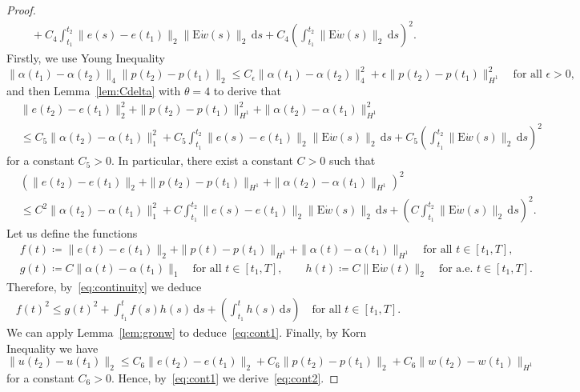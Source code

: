 \documentclass[10pt,a4paper]{amsart}
\def\EE {\mathrm{E}}
\def\de {\mathrm{d}}
\begin{document}
\begin{proof}
\begin{align*}
&\quad+C_4\int_{t_1}^{t_2}\|e(s)-e(t_1)\|_2\|\EE \dot w(s)\|_2\,\de s+C_4\left(\int_{t_1}^{t_2}\|\EE \dot w(s)\|_2\,\de s\right)^2.
\end{align*}
Firstly, we use Young Inequality
$$\|\alpha(t_1)-\alpha(t_2)\|_4\|p(t_2)-p(t_1)\|_2\le C_\epsilon\|\alpha(t_1)-\alpha(t_2)\|_4^2+\epsilon\|p(t_2)-p(t_1)\|_{H^1}^2\quad\text{for all $\epsilon>0$},$$
and then Lemma~\ref{lem:Cdelta} with $\theta=4$ to derive that
\begin{align*}
&\|e(t_2)-e(t_1)\|_2^2+\|p(t_2)-p(t_1)\|_{H^1}^2+\|\alpha(t_2)-\alpha(t_1)\|_{H^1}^2\\
&\le C_5\|\alpha(t_2)-\alpha(t_1)\|_1^2+C_5\int_{t_1}^{t_2}\|e(s)-e(t_1)\|_2\|\EE \dot w(s)\|_2\,\de s+C_5\left(\int_{t_1}^{t_2}\|\EE \dot w(s)\|_2\,\de s\right)^2
\end{align*}
for a constant $C_5>0$. In particular, there exist a constant $C>0$ such that
\begin{align}
&\left(\|e(t_2)-e(t_1)\|_2+\|p(t_2)-p(t_1)\|_{H^1}+\|\alpha(t_2)-\alpha(t_1)\|_{H^1}\right)^2\nonumber\\
&\le C^2\|\alpha(t_2)-\alpha(t_1)\|_1^2+C\int_{t_1}^{t_2}\|e(s)-e(t_1)\|_2\|\EE \dot w(s)\|_2\,\de s+\left(C\int_{t_1}^{t_2}\|\EE \dot w(s)\|_2\,\de s\right)^2.\label{eq:continuity}
\end{align}
Let us define the functions
\begin{align*}
&f(t)\coloneqq\|e(t)-e(t_1)\|_2+\|p(t)-p(t_1)\|_{H^1}+\|\alpha(t)-\alpha(t_1)\|_{H^1}\quad\text{for all $t\in[t_1,T]$},\\
&g(t)\coloneqq C\|\alpha(t)-\alpha(t_1)\|_1\quad\text{for all $t\in[t_1,T]$},\qquad h(t)\coloneqq C\|\EE \dot w(t)\|_2\quad\text{for a.e.\ $t\in[t_1,T]$}.
\end{align*}
Therefore, by~\eqref{eq:continuity} we deduce
\begin{align*}
f(t)^2\le g(t)^2+\int_{t_1}^tf(s)h(s)\,\de s+\left(\int_{t_1}^th(s)\,\de s\right)\quad\text{for all $t\in[t_1,T]$}.
\end{align*}
We can apply Lemma~\ref{lem:gronw} to deduce~\eqref{eq:cont1}. Finally, by Korn Inequality we have
$$\|u(t_2)-u(t_1)\|_2\le C_6\|e(t_2)-e(t_1)\|_2+C_6\|p(t_2)-p(t_1)\|_2+C_6\|w(t_2)-w(t_1)\|_{H^1}$$
for a constant $C_6>0$. Hence, by~\eqref{eq:cont1} we derive~\eqref{eq:cont2}.

\end{proof}
\end{document}

